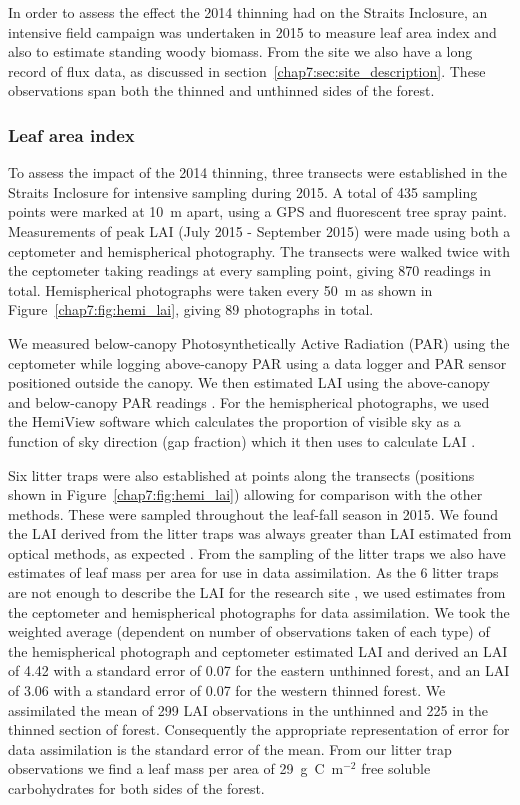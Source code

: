 In order to assess the effect the 2014 thinning had on the Straits Inclosure, an intensive field campaign was undertaken in 2015 to measure leaf area index and also to estimate standing woody biomass. From the site we also have a long record of flux data, as discussed in section~\ref{chap7:sec:site_description}. These observations span both the thinned and unthinned sides of the forest.

\subsubsection{Leaf area index}

To assess the impact of the 2014 thinning, three transects were established in the Straits Inclosure for intensive sampling during 2015. A total of 435 sampling points were marked at 10~m apart, using a GPS and fluorescent tree spray paint. Measurements of peak LAI (July 2015 - September 2015) were made using both a ceptometer and hemispherical photography. The transects were walked twice with the ceptometer taking readings at every sampling point, giving 870 readings in total. Hemispherical photographs were taken every 50~m as shown in Figure~\ref{chap7:fig:hemi_lai}, giving 89 photographs in total. 

We measured below-canopy Photosynthetically Active Radiation (PAR) using the ceptometer while logging above-canopy PAR using a data logger and PAR sensor positioned outside the canopy. We then estimated LAI using the above-canopy and below-canopy PAR readings \citep{fassnacht1994comparison}. For the hemispherical photographs, we used the HemiView software \citep{rich1999hemiview} which calculates the proportion of visible sky as a function of sky direction (gap fraction) which it then uses to calculate LAI \citep{Jonckheere2004}.

Six litter traps were also established at points along the transects (positions shown in Figure~\ref{chap7:fig:hemi_lai}) allowing for comparison with the other methods. These were sampled throughout the leaf-fall season in 2015. We found the LAI derived from the litter traps was always greater than LAI estimated from optical methods, as expected \citep{breda2003ground}. From the sampling of the litter traps we also have estimates of leaf mass per area for use in data assimilation. As the 6 litter traps are not enough to describe the LAI for the research site \citep{kimmins1973some}, we used estimates from the ceptometer and hemispherical photographs for data assimilation. We took the weighted average (dependent on number of observations taken of each type) of the hemispherical photograph and ceptometer estimated LAI and derived an LAI of 4.42 with a standard error of 0.07 for the eastern unthinned forest, and an LAI of 3.06 with a standard error of 0.07 for the western thinned forest. We assimilated the mean of 299 LAI observations in the unthinned and 225 in the thinned section of forest. Consequently the appropriate representation of error for data assimilation is the standard error of the mean. From our litter trap observations we find a leaf mass per area of 29~g~C~m\(^{-2}\) free soluble carbohydrates for both sides of the forest.


